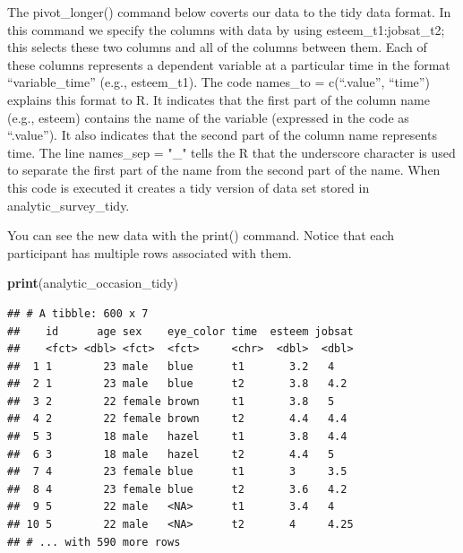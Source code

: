 \documentclass[
]{krantz}
\makeatletter
\newenvironment{Shaded}{\begin{snugshade}}{\end{snugshade}}
\newcommand{\DataTypeTok}[1]{\textcolor[rgb]{0.27,0.27,0.27}{#1}}
\newcommand{\KeywordTok}[1]{\textcolor[rgb]{0.27,0.27,0.27}{\textbf{#1}}}
\newcommand{\NormalTok}[1]{#1}
\newcommand{\OperatorTok}[1]{\textcolor[rgb]{0.43,0.43,0.43}{\textbf{#1}}}
\newcommand{\StringTok}[1]{\textcolor[rgb]{0.5,0.5,0.5}{#1}}
\newenvironment{kframe}{%
\medskip{}
\setlength{\fboxsep}{.8em}
 \def\at@end@of@kframe{}%
 \ifinner\ifhmode%
  \def\at@end@of@kframe{\end{minipage}}%
  \begin{minipage}{\columnwidth}%
 \fi\fi%
 \def\FrameCommand##1{\hskip\@totalleftmargin \hskip-\fboxsep
 \colorbox{shadecolor}{##1}\hskip-\fboxsep
     \hskip-\linewidth \hskip-\@totalleftmargin \hskip\columnwidth}%
 \MakeFramed {\advance\hsize-\width
   \@totalleftmargin\z@ \linewidth\hsize
   \@setminipage}}%
 {\par\unskip\endMakeFramed%
 \at@end@of@kframe}
\renewenvironment{Shaded}{\begin{kframe}}{\end{kframe}}
\makeatother
\begin{document}
The pivot\_longer() command below coverts our data to the tidy data format. In this command we specify the columns with data by using esteem\_t1:jobsat\_t2; this selects these two columns and all of the columns between them. Each of these columns represents a dependent variable at a particular time in the format ``variable\_time'' (e.g., esteem\_t1). The code names\_to = c(``.value'', ``time'') explains this format to R. It indicates that the first part of the column name (e.g., esteem) contains the name of the variable (expressed in the code as ``.value''). It also indicates that the second part of the column name represents time. The line names\_sep = "\_" tells the R that the underscore character is used to separate the first part of the name from the second part of the name. When this code is executed it creates a tidy version of data set stored in analytic\_survey\_tidy.

\begin{Shaded}
\end{Shaded}

You can see the new data with the print() command. Notice that each participant has multiple rows associated with them.

\begin{Shaded}
\begin{Highlighting}[]
\KeywordTok{print}\NormalTok{(analytic_occasion_tidy)}
\end{Highlighting}
\end{Shaded}

\begin{verbatim}
## # A tibble: 600 x 7
##    id      age sex    eye_color time  esteem jobsat
##    <fct> <dbl> <fct>  <fct>     <chr>  <dbl>  <dbl>
##  1 1        23 male   blue      t1       3.2   4   
##  2 1        23 male   blue      t2       3.8   4.2 
##  3 2        22 female brown     t1       3.8   5   
##  4 2        22 female brown     t2       4.4   4.4 
##  5 3        18 male   hazel     t1       3.8   4.4 
##  6 3        18 male   hazel     t2       4.4   5   
##  7 4        23 female blue      t1       3     3.5 
##  8 4        23 female blue      t2       3.6   4.2 
##  9 5        22 male   <NA>      t1       3.4   4   
## 10 5        22 male   <NA>      t2       4     4.25
## # ... with 590 more rows
\end{verbatim}
\end{document}
